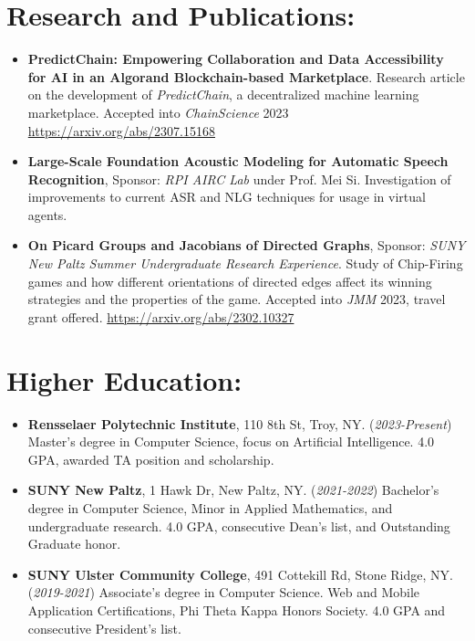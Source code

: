 \section*{Research and Publications:}
\begin{itemize}
    \itemsep0em
    \item \textbf{PredictChain: Empowering Collaboration and Data Accessibility for AI in an Algorand Blockchain-based Marketplace}.  Research article on the development of \textit{PredictChain}, a decentralized machine learning marketplace.  Accepted into \textit{ChainScience} 2023 \url{https://arxiv.org/abs/2307.15168}
    
    \item \textbf{Large-Scale Foundation Acoustic Modeling for Automatic Speech Recognition}, Sponsor: \textit{RPI AIRC Lab} under Prof. Mei Si. Investigation of improvements to current ASR and NLG techniques for usage in virtual agents.

    \item \textbf{On Picard Groups and Jacobians of Directed Graphs}, Sponsor: \textit{SUNY New Paltz Summer Undergraduate Research Experience}. Study of Chip-Firing games and how different orientations of directed edges affect its winning strategies and the properties of the game.  Accepted into \textit{JMM} 2023, travel grant offered.  \url{https://arxiv.org/abs/2302.10327}
    
\end{itemize}

\section*{Higher Education:}
\begin{itemize}
    \itemsep0em
    \item \textbf{Rensselaer Polytechnic Institute}, 110 8th St, Troy, NY. (\textit{2023-Present}) Master's degree in Computer Science, focus on Artificial Intelligence.  4.0 GPA, awarded TA position and scholarship.
    \item \textbf{SUNY New Paltz}, 1 Hawk Dr, New Paltz, NY. (\textit{2021-2022}) Bachelor's degree in Computer Science, Minor in Applied Mathematics, and undergraduate research. 4.0 GPA, consecutive Dean's list, and Outstanding Graduate honor.
    \item \textbf{SUNY Ulster Community College}, 491 Cottekill Rd, Stone Ridge, NY. (\textit{2019-2021}) Associate's degree in Computer Science. Web and Mobile Application Certifications, Phi Theta Kappa Honors Society. 4.0 GPA and consecutive President's list.
\end{itemize}

